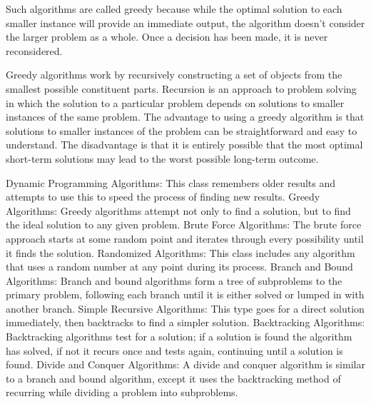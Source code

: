 Such algorithms are called greedy because while the optimal solution to each smaller instance will provide an immediate output, the algorithm doesn’t consider the larger problem as a whole. Once a decision has been made, it is never reconsidered.

Greedy algorithms work by recursively constructing a set of objects from the smallest possible constituent parts. Recursion is an approach to problem solving in which the solution to a particular problem depends on solutions to smaller instances of the same problem. The advantage to using a greedy algorithm is that solutions to smaller instances of the problem can be straightforward and easy to understand. The disadvantage is that it is entirely possible that the most optimal short-term solutions may lead to the worst possible long-term outcome.
 


Dynamic Programming Algorithms: This class remembers older results and attempts to use this to speed the process of finding new results.
Greedy Algorithms: Greedy algorithms attempt not only to find a solution, but to find the ideal solution to any given problem.
Brute Force Algorithms: The brute force approach starts at some random point and iterates through every possibility until it finds the solution.
Randomized Algorithms: This class includes any algorithm that uses a random number at any point during its process.
Branch and Bound Algorithms: Branch and bound algorithms form a tree of subproblems to the primary problem, following each branch until it is either solved or lumped in with another branch.
Simple Recursive Algorithms: This type goes for a direct solution immediately, then backtracks to find a simpler solution.
Backtracking Algorithms: Backtracking algorithms test for a solution; if a solution is found the algorithm has solved, if not it recurs once and tests again, continuing until a solution is found.
Divide and Conquer Algorithms: A divide and conquer algorithm is similar to a branch and bound algorithm, except it uses the backtracking method of recurring while dividing a problem into subproblems.
 



 

 
